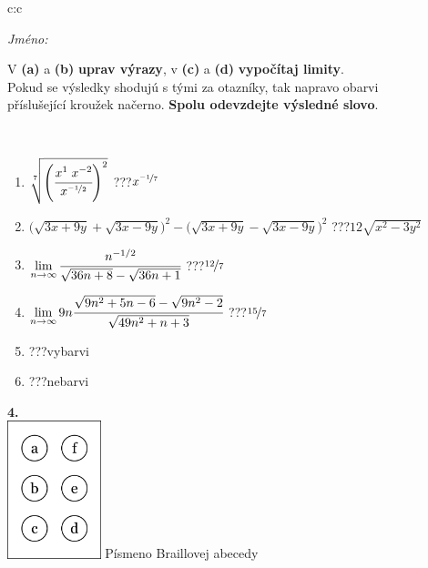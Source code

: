 \documentclass[10pt]{report}
\begin{document}
\begin{tabular}{c:c}
\begin{minipage}[c][104.5mm][t]{0.5\linewidth}
\begin{center}
\textit{Jméno:}\phantom{xxxxxxxxxxxxxxxxxxxxxxxxxxxxxxxxxxxxxxxxxxxxxxxxxxxxxxxxxxxxxxxxx}\\[5mm]
\begin{minipage}{0.95\linewidth}
\begin{center}
V \textbf{(a)} a \textbf{(b)} \textbf{uprav výrazy}, v \textbf{(c)} a \textbf{(d)} \textbf{vypočítaj limity}.\\Pokud se výsledky shodujú s tými za otazníky, tak napravo obarvi\\příslušející kroužek načerno. \textbf{Spolu odevzdejte výsledné slovo}.
\end{center}
\end{minipage}
\\[1mm]
\begin{minipage}{0.79\linewidth}
\begin{center}
\begin{varwidth}{\linewidth}
\begin{enumerate}
\small
\item $\sqrt[7]{\left(\cfrac{x^{1}\;x^{-2}}{x^{\nicefrac{-1}{2}}}\right)^{2}}$\quad \dotfill\; ???\;\dotfill \quad $x^{\nicefrac{-1}{7}}$
\item {\footnotesize{\scriptsize$\big(\sqrt{3x+9y}+\sqrt{3x-9y}\big)^2-\big(\sqrt{3x+9y}-\sqrt{3x-9y}\big)^2$}\quad \dotfill\; ???\;\dotfill \quad $12\sqrt{x^2-3y^2}$}
\item $\lim\limits_{n\to\infty}\cfrac{n^{-1/2}}{\sqrt{36n+8}-\sqrt{36n+1}}$\quad \dotfill\; ???\;\dotfill \quad $\nicefrac{12}{7}$
\item $\lim\limits_{n\to\infty}9n\cfrac{\sqrt{9n^2+5n-6}-\sqrt{9n^2-2}}{\sqrt{49n^2+n+3}}$\quad \dotfill\; ???\;\dotfill \quad $\nicefrac{15}{7}$
\item \quad \dotfill\; ???\;\dotfill \quad vybarvi
\item \quad \dotfill\; ???\;\dotfill \quad nebarvi
\end{enumerate}
\end{varwidth}
\end{center}
\end{minipage}
\begin{minipage}{0.20\linewidth}
\begin{center}
{\Huge\bfseries 4.} \\[2mm]
\includegraphics[height=40mm]{../images/braille.png}
{\small Písmeno Braillovej abecedy}
\end{center}
\end{minipage}
\end{center}
\end{minipage}
%
\end{tabular}
\end{document}
